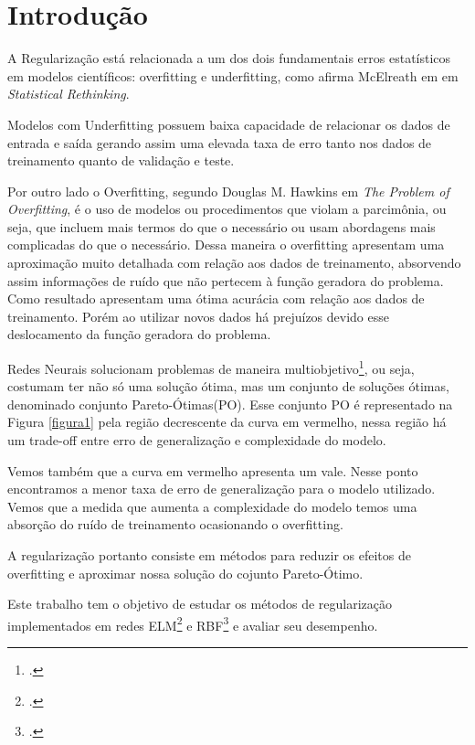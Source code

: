 \section{Introdução}
A Regularização está relacionada a um dos dois fundamentais erros estatísticos em modelos científicos: overfitting e underfitting, como afirma McElreath em em \emph{Statistical Rethinking}\cite{mcelreath2016statistical}.

Modelos com Underfitting possuem baixa capacidade de relacionar os dados de entrada e saída gerando assim uma elevada taxa de erro tanto nos dados de treinamento quanto de validação e teste.

Por outro lado o Overfitting, segundo Douglas M. Hawkins em \emph{The Problem of Overfitting}\cite{OverfittigProblems}, é o uso de modelos ou procedimentos que violam a parcimônia, ou seja, que incluem mais termos do que o necessário ou usam abordagens mais complicadas do que o necessário.\cite*{OverfittigProblems}
Dessa maneira o overfitting apresentam uma aproximação muito detalhada com relação aos dados de treinamento, absorvendo assim informações de ruído que não pertecem à função geradora do problema.
Como resultado apresentam uma ótima acurácia com relação aos dados de treinamento. Porém ao utilizar novos dados há prejuízos devido esse deslocamento da função geradora do problema.

Redes Neurais solucionam problemas de maneira multiobjetivo\footcite{Problemas multiobjetivo: Problemas com mais de um objetivo}, ou seja, costumam ter não só uma solução ótima, mas um conjunto de soluções ótimas, denominado conjunto Pareto-Ótimas(PO).
Esse conjunto PO é representado na Figura \ref*{figura1} pela região decrescente da curva em vermelho, nessa região há um trade-off entre erro de generalização e complexidade do modelo.

Vemos também que a curva em vermelho apresenta um vale. Nesse ponto encontramos a menor taxa de erro de generalização para o modelo utilizado.
Vemos que a medida que aumenta a complexidade do modelo temos uma absorção do ruído de treinamento ocasionando o overfitting.

A regularização portanto consiste em métodos para reduzir os efeitos de overfitting e aproximar nossa solução do cojunto Pareto-Ótimo.

Este trabalho tem o objetivo de estudar os métodos de regularização implementados em redes ELM\footcite{ELM: Extreme Learning Machines} e RBF\footcite{RBF: Radial Basis Function} e avaliar seu desempenho.


